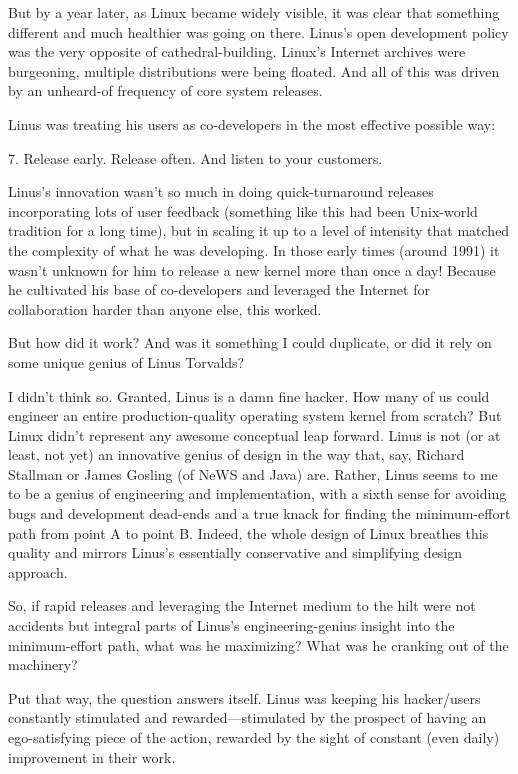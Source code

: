 \documentclass[a4paper,12pt,UTF8,twoside]{ctexbook}
\begin{document}
But by a year later, as Linux became widely visible, it was clear that something different and much healthier was going on there. Linus's open development policy was the very opposite of cathedral-building. Linux's Internet archives were burgeoning, multiple distributions were being floated. And all of this was driven by an unheard-of frequency of core system releases.

Linus was treating his users as co-developers in the most effective possible way:

7. Release early. Release often. And listen to your customers.

Linus's innovation wasn't so much in doing quick-turnaround releases incorporating lots of user feedback (something like this had been Unix-world tradition for a long time), but in scaling it up to a level of intensity that matched the complexity of what he was developing. In those early times (around 1991) it wasn't unknown for him to release a new kernel more than once a day! Because he cultivated his base of co-developers and leveraged the Internet for collaboration harder than anyone else, this worked.

But how did it work? And was it something I could duplicate, or did it rely on some unique genius of Linus Torvalds?

I didn't think so. Granted, Linus is a damn fine hacker. How many of us could engineer an entire production-quality operating system kernel from scratch? But Linux didn't represent any awesome conceptual leap forward. Linus is not (or at least, not yet) an innovative genius of design in the way that, say, Richard Stallman or James Gosling (of NeWS and Java) are. Rather, Linus seems to me to be a genius of engineering and implementation, with a sixth sense for avoiding bugs and development dead-ends and a true knack for finding the minimum-effort path from point A to point B. Indeed, the whole design of Linux breathes this quality and mirrors Linus's essentially conservative and simplifying design approach.

So, if rapid releases and leveraging the Internet medium to the hilt were not accidents but integral parts of Linus's engineering-genius insight into the minimum-effort path, what was he maximizing? What was he cranking out of the machinery?

Put that way, the question answers itself. Linus was keeping his hacker/users constantly stimulated and rewarded—stimulated by the prospect of having an ego-satisfying piece of the action, rewarded by the sight of constant (even daily) improvement in their work.
\end{document}

